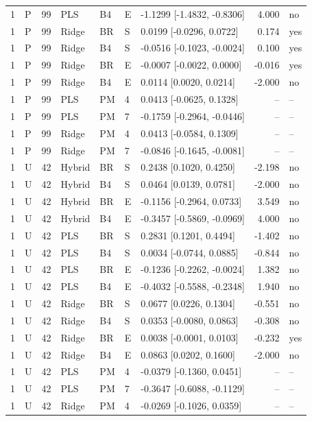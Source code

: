 \documentclass[10pt,a4paper]{article}
\begin{document}
\begin{landscape}
\begin{longtable}{rlrllllrl}
1 & P & 99 & PLS & B4 & E & -1.1299 [-1.4832, -0.8306] & 4.000 & no \\
1 & P & 99 & Ridge & BR & S & 0.0199 [-0.0296, 0.0722] & 0.174 & yes \\
1 & P & 99 & Ridge & B4 & S & -0.0516 [-0.1023, -0.0024] & 0.100 & yes \\
1 & P & 99 & Ridge & BR & E & -0.0007 [-0.0022, 0.0000] & -0.016 & yes \\
1 & P & 99 & Ridge & B4 & E & 0.0114 [0.0020, 0.0214] & -2.000 & no \\
1 & P & 99 & PLS & PM & 4 & 0.0413 [-0.0625, 0.1328] & -- & -- \\
1 & P & 99 & PLS & PM & 7 & -0.1759 [-0.2964, -0.0446] & -- & -- \\
1 & P & 99 & Ridge & PM & 4 & 0.0413 [-0.0584, 0.1309] & -- & -- \\
1 & P & 99 & Ridge & PM & 7 & -0.0846 [-0.1645, -0.0081] & -- & -- \\
1 & U & 42 & Hybrid & BR & S & 0.2438 [0.1020, 0.4250] & -2.198 & no \\
1 & U & 42 & Hybrid & B4 & S & 0.0464 [0.0139, 0.0781] & -2.000 & no \\
1 & U & 42 & Hybrid & BR & E & -0.1156 [-0.2964, 0.0733] & 3.549 & no \\
1 & U & 42 & Hybrid & B4 & E & -0.3457 [-0.5869, -0.0969] & 4.000 & no \\
1 & U & 42 & PLS & BR & S & 0.2831 [0.1201, 0.4494] & -1.402 & no \\
1 & U & 42 & PLS & B4 & S & 0.0034 [-0.0744, 0.0885] & -0.844 & no \\
1 & U & 42 & PLS & BR & E & -0.1236 [-0.2262, -0.0024] & 1.382 & no \\
1 & U & 42 & PLS & B4 & E & -0.4032 [-0.5588, -0.2348] & 1.940 & no \\
1 & U & 42 & Ridge & BR & S & 0.0677 [0.0226, 0.1304] & -0.551 & no \\
1 & U & 42 & Ridge & B4 & S & 0.0353 [-0.0080, 0.0863] & -0.308 & no \\
1 & U & 42 & Ridge & BR & E & 0.0038 [-0.0001, 0.0103] & -0.232 & yes \\
1 & U & 42 & Ridge & B4 & E & 0.0863 [0.0202, 0.1600] & -2.000 & no \\
1 & U & 42 & PLS & PM & 4 & -0.0379 [-0.1360, 0.0451] & -- & -- \\
1 & U & 42 & PLS & PM & 7 & -0.3647 [-0.6088, -0.1129] & -- & -- \\
1 & U & 42 & Ridge & PM & 4 & -0.0269 [-0.1026, 0.0359] & -- & -- \\

\end{longtable}
\end{landscape}
\end{document}
